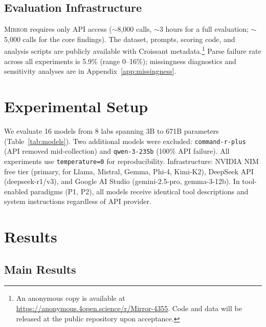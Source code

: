 \documentclass[10pt]{article}
\newcommand{\mirror}{\textsc{Mirror}}
\begin{document}
\subsection{Evaluation Infrastructure}

\mirror{} requires only API access ($\sim$8,000 calls, $\sim$3 hours for a full evaluation; $\sim$5,000 calls for the core findings). The dataset, prompts, scoring code, and analysis scripts are publicly available with Croissant metadata.\footnote{An anonymous copy is available at \url{https://anonymous.4open.science/r/Mirror-4355}. Code and data will be released at the public repository upon acceptance.} Parse failure rate across all experiments is 5.9\% (range 0--16\%); missingness diagnostics and sensitivity analyses are in Appendix~\ref{app:missingness}.

\section{Experimental Setup}
\label{sec:setup}



We evaluate 16 models from 8 labs spanning 3B to 671B parameters
(Table~\ref{tab:models}). Two additional models were excluded: \texttt{command-r-plus} (API removed mid-collection) and \texttt{qwen-3-235b} (100\% API failure). All experiments use \texttt{temperature=0} for reproducibility. Infrastructure: NVIDIA NIM free tier (primary, for Llama, Mistral, Gemma, Phi-4, Kimi-K2), DeepSeek API (deepseek-r1/v3), and Google AI Studio (gemini-2.5-pro, gemma-3-12b). In tool-enabled paradigms (P1, P2), all models receive identical tool descriptions and system instructions regardless of API provider.

\section{Results}
\label{sec:results}

\subsection{Main Results}
\end{document}
